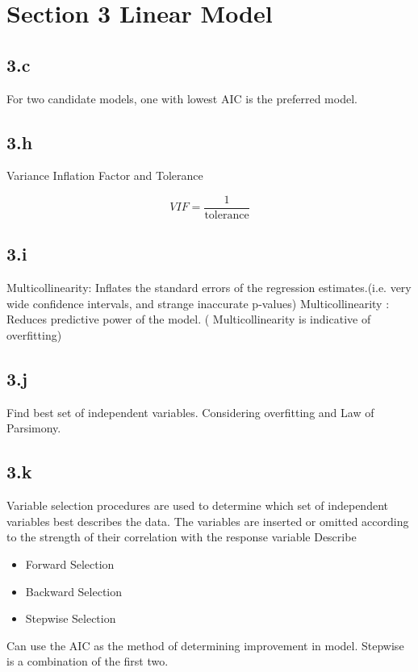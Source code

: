 \documentclass[]{article}
\title{}
\author{}
\begin{document}
\maketitle

\begin{abstract}

\end{abstract}

\section*{Section 3 Linear Model}

\subsection*{3.c} For two candidate models, one with lowest AIC is the preferred model.

\subsection*{3.h}
Variance Inflation Factor and Tolerance

\[VIF = \frac{1}{\mbox{tolerance}}\]

\subsection*{3.i}
Multicollinearity: Inflates the standard errors of the regression estimates.(i.e. very wide confidence intervals, and strange inaccurate p-values)
Multicollinearity : Reduces predictive power of the model. ( Multicollinearity is indicative of 
overfitting)

\subsection*{3.j}
Find best set of independent variables. Considering overfitting and Law of Parsimony.

\subsection*{3.k} Variable selection procedures are used to determine which set of independent variables best describes the data. The variables are inserted or omitted according to the strength of their correlation with the response variable
Describe
\begin{itemize}
\item Forward Selection
\item Backward Selection
\item Stepwise Selection
\end{itemize}

Can use the AIC as the method of determining improvement in model. Stepwise is a combination of the first two.
\end{document}
